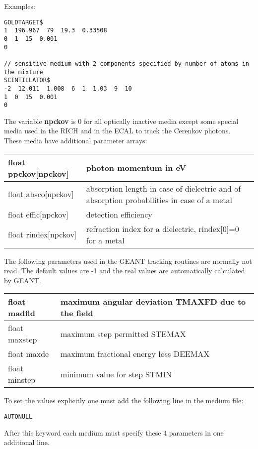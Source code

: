 Examples:
\begin{lstlisting}
GOLDTARGET$
1  196.967  79  19.3  0.33508
0  1  15  0.001
0

// sensitive medium with 2 components specified by number of atoms in the mixture
SCINTILLATOR$
-2  12.011  1.008  6  1  1.03  9  10  
1  0  15  0.001
0
\end{lstlisting}

The variable \textbf{npckov} is 0 for all optically inactive media except some special media used in the RICH and 
in the ECAL to track the Cerenkov photons.\\
These media have additional parameter arrays:\\
\begin{tabular}{|l|l|}
  \hline
  float ppckov[npckov] & photon momentum in eV\\
  \hline
  float absco[npckov]  & absorption length in case of dielectric and of absorption probabilities in case of a metal\\
  \hline
  float effic[npckov]  & detection efficiency\\
  \hline
  float rindex[npckov] & refraction index for a dielectric, rindex[0]=0 for a metal\\
  \hline
\end{tabular}\vspace*{2ex}

The following parameters used in the GEANT tracking routines are normally not read. The default values are -1 and the real 
values are automatically calculated by GEANT.\\
\begin{tabular}{|l|l|}
  \hline
  float madfld & maximum angular deviation TMAXFD due to the field\\
  \hline
  float maxstep & maximum step permitted STEMAX\\
  \hline
  float maxde & maximum fractional energy loss DEEMAX\\
  \hline
  float minstep & minimum value for step STMIN\\
  \hline
\end{tabular}\vspace*{1.5ex}

To set the values explicitly one must add the following line in the medium file:
\begin{lstlisting}
AUTONULL
\end{lstlisting}
After this keyword each medium must specify these 4 parameters in one additional line.


